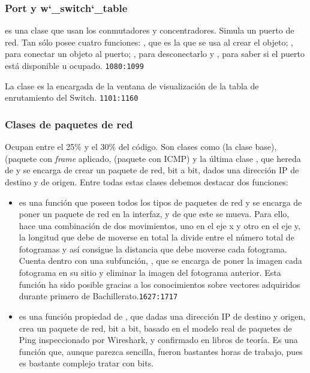 \documentclass[a4paper, 11pt]{report} %
\begin{document}
\subsubsection{Port y w\char`_switch\char`_table}
 es una clase que usan los conmutadores y concentradores. Simula un puerto de red. Tan sólo posee cuatro funciones: , que es la que se usa al crear el objeto; , para conectar un objeto al puerto; , para desconectarlo y , para saber si el puerto está disponible u ocupado. \texttt{1080:1099}

La clase  es la encargada de la ventana de visualización de la tabla de enrutamiento del Switch. \texttt{1101:1160}

\subsubsection{Clases de paquetes de red}
Ocupan entre el 25\% y el 30\% del código. Son clases como  (la clase base),  (paquete con \textit{frame} aplicado,  (paquete con ICMP) y la última clase , que hereda de  y se encarga de crear un paquete de red, bit a bit, dados una dirección IP de destino y de origen.
Entre todas estas clases debemos destacar dos funciones:
\begin{itemize}
\item {} es una función que poseen todos los tipos de paquetes de red y se encarga de poner un paquete de red en la interfaz, y de que este se mueva. Para ello, hace una combinación de dos movimientos, uno en el eje x y otro en el eje y, la longitud que debe de moverse en total la divide entre el número total de fotogramas y así consigue la distancia que debe moverse cada fotograma. Cuenta dentro con una subfunción, , que se encarga de poner la imagen cada fotograma en su sitio y eliminar la imagen del fotograma anterior. Esta función ha sido posible gracias a los conocimientos sobre vectores adquiridos durante primero de 
Bachillerato.\texttt{1627:1717}
\item {} es una función propiedad de , que dadas una dirección IP de destino y origen, crea un paquete de red, bit a bit, basado en el modelo real de paquetes de Ping inspeccionado por Wireshark, y confirmado en libros de teoría. Es una función que, aunque parezca sencilla, fueron bastantes horas de trabajo, pues es bastante complejo tratar con bits.
\end{itemize}
\inputminted[firstline=1782, lastline=1818, baselinestretch=1, fontsize=\scriptsize, linenos, breaklines]{python}{Codigo/Main.py}
\end{document}
